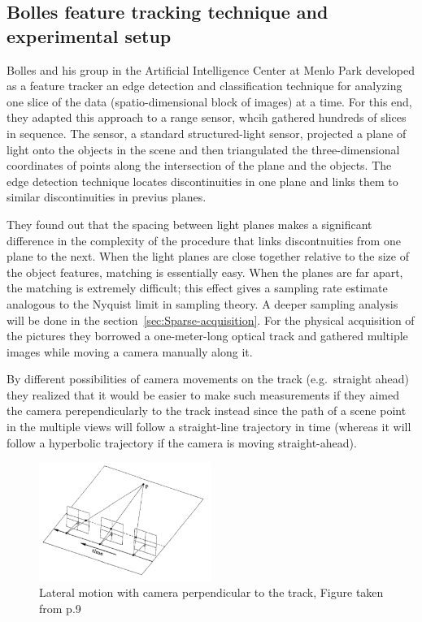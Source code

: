 \subsection{Bolles feature tracking technique and experimental setup}

Bolles and his group in the Artificial Intelligence Center at Menlo Park developed as a feature tracker an edge detection and classification technique for analyzing one slice of the data (spatio-dimensional block of images) at a time. For this end, they adapted this approach to a range sensor, whcih gathered hundreds of slices in sequence. The sensor, a standard structured-light sensor, projected a plane of light onto the objects in the scene and then triangulated the three-dimensional coordinates of points along the intersection of the plane and the objects. The edge detection technique locates discontinuities in one plane and links them to similar discontinuities in previus planes. 

\bigskip

They found out that the spacing between light planes makes a significant difference in the complexity of the procedure that links discontnuities from one plane to the next. When the light planes are close together relative to the size of the object features, matching is essentially easy. When the planes are far apart, the matching is extremely difficult; this effect gives a sampling rate estimate analogous to the Nyquist limit in sampling theory. A deeper sampling analysis will be done in the section~\ref{sec:Sparse-acquisition}. For the physical acquisition of the pictures they borrowed a one-meter-long optical track and gathered multiple images while moving a camera manually along it. 

\bigskip

By different possibilities of camera movements on the track (e.g.\ straight ahead) they realized that it would be easier to make such measurements if they aimed the camera perependicularly to the track instead since the path of a scene point in the multiple views will follow a straight-line trajectory in time (whereas it will follow a hyperbolic trajectory if the camera is moving straight-ahead). 

\begin{figure}[h!]
\centering
\includegraphics[width= 0.50\textwidth]{./Diagrams/perp-move.jpg}
\caption{Lateral motion with camera perpendicular to the track, Figure taken from \cite{Bolles} p.9}
\end{figure}

